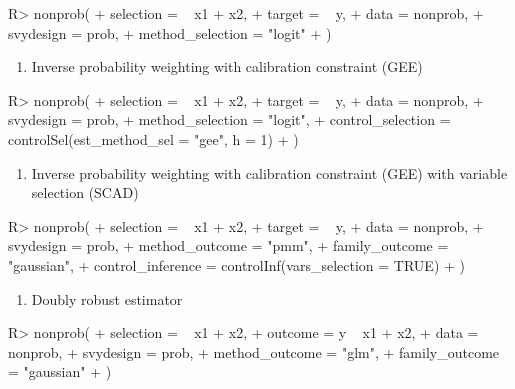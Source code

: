 \documentclass[
]{jss}
\providecommand{\tightlist}{%
  \setlength{\itemsep}{0pt}\setlength{\parskip}{0pt}}
\begin{document}
\begin{CodeChunk}
\begin{CodeInput}
R> nonprob(
+   selection =  ~ x1 + x2, 
+   target = ~ y, 
+   data = nonprob, 
+   svydesign = prob, 
+   method_selection = "logit"
+ )
\end{CodeInput}
\end{CodeChunk}

\begin{enumerate}
\def\labelenumi{\arabic{enumi}.}
\setcounter{enumi}{5}
\tightlist
\item
  Inverse probability weighting with calibration constraint (GEE)
\end{enumerate}

\begin{CodeChunk}
\begin{CodeInput}
R> nonprob(
+   selection =  ~ x1 + x2, 
+   target = ~ y, 
+   data = nonprob, 
+   svydesign = prob, 
+   method_selection = "logit", 
+   control_selection = controlSel(est_method_sel = "gee", h = 1)
+ )
\end{CodeInput}
\end{CodeChunk}

\begin{enumerate}
\def\labelenumi{\arabic{enumi}.}
\setcounter{enumi}{6}
\tightlist
\item
  Inverse probability weighting with calibration constraint (GEE) with
  variable selection (SCAD)
\end{enumerate}

\begin{CodeChunk}
\begin{CodeInput}
R> nonprob(
+   selection =  ~ x1 + x2, 
+   target = ~ y, 
+   data = nonprob, 
+   svydesign = prob, 
+   method_outcome = "pmm", 
+   family_outcome = "gaussian", 
+   control_inference = controlInf(vars_selection = TRUE)
+ )
\end{CodeInput}
\end{CodeChunk}

\begin{enumerate}
\def\labelenumi{\arabic{enumi}.}
\setcounter{enumi}{7}
\tightlist
\item
  Doubly robust estimator
\end{enumerate}

\begin{CodeChunk}
\begin{CodeInput}
R> nonprob(
+   selection = ~ x1 + x2, 
+   outcome = y ~ x1 + x2, 
+   data = nonprob, 
+   svydesign = prob, 
+   method_outcome = "glm", 
+   family_outcome = "gaussian"
+ )
\end{CodeInput}
\end{CodeChunk}
\end{document}
